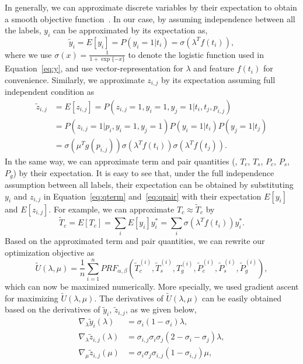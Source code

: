 In generally, we can approximate discrete variables by their expectation to obtain a smooth objective function~\cite{jansche2005maximum}. In our case, by assuming independence between all the labels, $y_i$ can be approximated by its expectation as, 
\begin{equation}
 \widetilde{y}_i = E[y_i]= P(y_i\!=\!1|t_i)= \sigma(\lambda^T f(t_i)),
\end{equation}
where we use $\sigma(x)=\frac{1}{1+\exp\{-x\}}$ to denote the logistic function used in Equation~\ref{eq:y}, and use vector-representation for $\lambda$ and feature $f(t_i)$ for convenience. Similarly, we approximate $z_{i,j}$ by its expectation assuming full independent condition as
\begin{equation}
\begin{split}
 \widetilde{z}_{i,j} &= E[z_{i,j}]= P(z_{i,j}\!=\!1,y_i\!=\!1,y_j\!=\!1|t_i,t_j,p_{i,j})\\
  &=P(z_{i,j}\!=\!1|p_i,y_i\!=\!1,y_j\!=\!1)P(y_i\!=\!1|t_i)P(y_j\!=\!1|t_j)\\
    &= \sigma(\mu^T g(p_{i,j}))\sigma(\lambda^T f(t_i))\sigma(\lambda^T f(t_j)).
\end{split}
\end{equation}
In the same way, we can approximate term and pair quantities (\ie, $T_c$, $T_s$, $P_c$, $P_s$, $P_g$) by their expectation. It is easy to see that, under the full independence assumption between all labels, their expectation can be obtained by substituting $y_i$ and $z_{i,j}$ in Equation~\ref{eq:qterm} and~\ref{eq:qpair} with their expectation $E[y_i]$ and $E[z_{i,j}]$. For example, we can approximate $T_c\approx \widetilde{T}_c$ by
\begin{equation}
 \widetilde{T}_c = E[T_c] = \sum_i{E[y_i]y_i^*}=\sum_i {\sigma(\lambda^T f(t_i))y_i^*}.
\end{equation}
Based on the approximated term and pair quantities, we can rewrite our optimization objective as 
\begin{equation}
 \widetilde{U}(\lambda,\mu)=\frac{1}{n}\sum_{i=1}^{n}P\!R\!F_{\alpha,\beta}(\widetilde{T}_c^{(i)},\widetilde{T}_s^{(i)},T_g^{(i)},\widetilde{P}_c^{(i)},\widetilde{P}_s^{(i)},\widetilde{P}_g^{(i)}),
\end{equation}
which can now be maximized numerically. More specially, we used gradient ascent for maximizing $\widetilde{U}(\lambda,\mu)$. The derivatives of $\widetilde{U}(\lambda,\mu)$ can be easily obtained based on the derivatives of $\widetilde{y}_i$, $\widetilde{z}_{i,j}$, as we given below,
\begin{equation}
 \begin{split}
  \nabla_{\lambda}\widetilde{y}_i(\lambda) &= \sigma_i (1-\sigma_i)\lambda, \\
  \nabla_{\lambda}\widetilde{z}_{i,j}(\lambda) &= \sigma_{i,j}\sigma_i\sigma_j(2-\sigma_i-\sigma_j)\lambda, \\
\nabla_{\mu}\widetilde{z}_{i,j}(\mu) &= \sigma_i\sigma_j\sigma_{i,j}(1-\sigma_{i,j})\mu,\\
 \end{split}
\end{equation}
